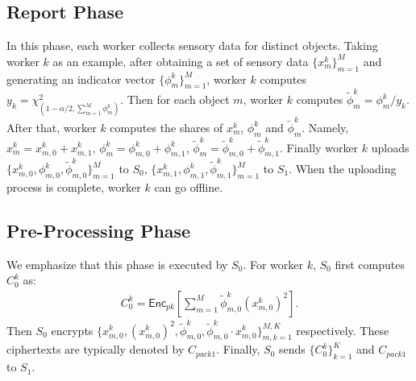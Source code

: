 \documentclass[conference]{IEEEtran}
\begin{document}
\subsection{Report Phase}
In this phase, each worker collects sensory data for distinct objects.
Taking worker $k$ as an example, after obtaining a set of sensory data $\{x_m^k\}_{m=1}^M$ and generating an indicator vector $\{\phi_m^k\}_{m=1}^M$, worker $k$ computes $y_k = \chi^2_{(1-\alpha/2, \sum_{m=1}^M \phi_m^k)}$.
Then for each object $m$, worker $k$ computes $\tilde{\phi}_m^k = \phi_m^k / y_k$.
After that, worker $k$ computes the shares of $x_m^k$, $\phi_m^k$ and $\tilde{\phi}_m^k$.
Namely, $x_m^k = x_{m,0}^k + x_{m,1}^k$, $\phi_m^k = \phi_{m,0}^k + \phi_{m,1}^k$, $\tilde{\phi}_m^k = \tilde{\phi}_{m,0}^k + \tilde{\phi}_{m,1}^k$.
Finally worker $k$ uploads $\{x_{m,0}^k, \phi_{m,0}^k ,\tilde{\phi}_{m,0}^k\}_{m=1}^M$ to $S_0$, $\{x_{m,1}^k, \phi_{m,1}^k, \tilde{\phi}_{m,1}^k\}_{m=1}^M$ to $S_1$.
When the uploading process is complete, worker $k$ can go offline.

\subsection{Pre-Processing Phase}
We emphasize that this phase is executed by $S_0$.
For worker $k$, $S_0$ first computes $C_0^k$ as: 
\begin{equation*}
  \begin{split}
  C_0^k = \mathsf{Enc}_{pk}\left[\sum_{m=1}^M \tilde{\phi}_{m,0}^k \left(x_{m,0}^k\right)^2\right].
  \end{split}
\end{equation*}
Then $S_0$ encrypts $\{x_{m,0}^k, (x_{m,0}^k)^2, \tilde{\phi}_{m,0}^k,\tilde{\phi}_{m,0}^k\cdot x_{m,0}^k\}_{m,k=1}^{M,K}$ respectively.
These ciphertexts are typically denoted by $C_{pack1}$.
Finally, $S_0$ sends $\{C_0^k\}_{k=1}^K$ and $C_{pack1}$ to $S_1$.
\end{document}
